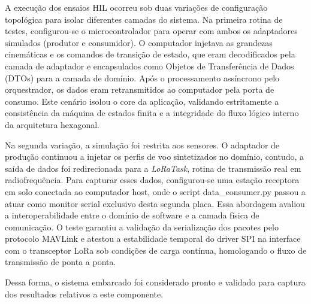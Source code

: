 A execução dos ensaios HIL ocorreu sob duas variações de configuração topológica para isolar diferentes camadas do sistema. Na primeira rotina de testes, configurou-se o microcontrolador para operar com ambos os adaptadores simulados (produtor e consumidor). O computador injetava as grandezas cinemáticas e os comandos de transição de estado, que eram decodificados pela camada de adaptador e encapsulados como Objetos de Transferência de Dados (DTOs) para a camada de domínio. Após o processamento assíncrono pelo orquestrador, os dados eram retransmitidos ao computador pela porta de consumo. Este cenário isolou o core da aplicação, validando estritamente a consistência da máquina de estados finita e a integridade do fluxo lógico interno da arquitetura hexagonal.

Na segunda variação, a simulação foi restrita aos sensores. O adaptador de produção continuou a injetar os perfis de voo sintetizados no domínio, contudo, a saída de dados foi redirecionada para a \textit{LoRaTask}, rotina de transmissão real em radiofrequência. Para capturar esses dados, configurou-se uma estação receptora em solo conectada ao computador host, onde o script data\_consumer.py passou a atuar como monitor serial exclusivo desta segunda placa. Essa abordagem avaliou a interoperabilidade entre o domínio de software e a camada física de comunicação. O teste garantiu a validação da serialização dos pacotes pelo protocolo MAVLink e atestou a estabilidade temporal do driver SPI na interface com o transceptor LoRa sob condições de carga contínua, homologando o fluxo de transmissão de ponta a ponta.

Dessa forma, o sistema embarcado foi considerado pronto e validado para captura dos resultados relativos a este componente.

